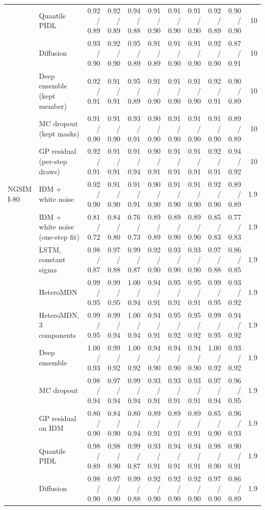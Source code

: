 \begin{table}[htbp]
\begin{tabular}{llrrrrrrrrr}
 & Quantile PIDL & 0.92 / 0.89 & 0.92 / 0.89 & 0.94 / 0.88 & 0.91 / 0.90 & 0.91 / 0.90 & 0.91 / 0.90 & 0.92 / 0.89 & 0.90 / 0.90 & 10 \\
 & Diffusion & 0.93 / 0.90 & 0.92 / 0.90 & 0.95 / 0.89 & 0.91 / 0.89 & 0.91 / 0.90 & 0.91 / 0.90 & 0.92 / 0.90 & 0.87 / 0.91 & 10 \\
 & Deep ensemble (kept member) & 0.92 / 0.91 & 0.91 / 0.91 & 0.95 / 0.89 & 0.91 / 0.90 & 0.91 / 0.90 & 0.91 / 0.90 & 0.92 / 0.91 & 0.90 / 0.89 & 10 \\
 & MC dropout (kept masks) & 0.91 / 0.90 & 0.91 / 0.90 & 0.93 / 0.91 & 0.90 / 0.90 & 0.91 / 0.90 & 0.91 / 0.90 & 0.91 / 0.90 & 0.89 / 0.89 & 10 \\
 & GP residual (per-step draws) & 0.92 / 0.91 & 0.91 / 0.91 & 0.91 / 0.94 & 0.90 / 0.91 & 0.91 / 0.91 & 0.91 / 0.91 & 0.92 / 0.91 & 0.94 / 0.92 & 10 \\
\midrule
NGSIM I-80 & IDM + white noise & 0.92 / 0.90 & 0.91 / 0.90 & 0.91 / 0.91 & 0.90 / 0.90 & 0.91 / 0.90 & 0.91 / 0.90 & 0.92 / 0.90 & 0.89 / 0.89 & 1.9 \\
 & IDM + white noise (one-step fit) & 0.81 / 0.72 & 0.84 / 0.80 & 0.76 / 0.73 & 0.89 / 0.89 & 0.89 / 0.90 & 0.89 / 0.90 & 0.85 / 0.83 & 0.77 / 0.83 & 1.9 \\
 & LSTM, constant sigma & 0.98 / 0.87 & 0.97 / 0.88 & 0.99 / 0.87 & 0.92 / 0.90 & 0.93 / 0.90 & 0.93 / 0.90 & 0.97 / 0.88 & 0.86 / 0.85 & 1.9 \\
 & HeteroMDN & 0.99 / 0.95 & 0.99 / 0.95 & 1.00 / 0.94 & 0.94 / 0.91 & 0.95 / 0.91 & 0.95 / 0.91 & 0.99 / 0.95 & 0.93 / 0.92 & 1.9 \\
 & HeteroMDN, 3 components & 0.99 / 0.95 & 0.99 / 0.94 & 1.00 / 0.94 & 0.94 / 0.91 & 0.95 / 0.92 & 0.95 / 0.92 & 0.99 / 0.95 & 0.94 / 0.92 & 1.9 \\
 & Deep ensemble & 1.00 / 0.93 & 0.99 / 0.92 & 1.00 / 0.92 & 0.94 / 0.90 & 0.94 / 0.90 & 0.94 / 0.90 & 1.00 / 0.92 & 0.93 / 0.92 & 1.9 \\
 & MC dropout & 0.98 / 0.94 & 0.97 / 0.94 & 0.99 / 0.94 & 0.93 / 0.91 & 0.93 / 0.91 & 0.93 / 0.91 & 0.97 / 0.94 & 0.96 / 0.95 & 1.9 \\
 & GP residual on IDM & 0.80 / 0.90 & 0.84 / 0.90 & 0.80 / 0.94 & 0.89 / 0.91 & 0.89 / 0.91 & 0.89 / 0.91 & 0.85 / 0.90 & 0.96 / 0.93 & 1.9 \\
 & Quantile PIDL & 0.98 / 0.89 & 0.98 / 0.90 & 0.99 / 0.87 & 0.93 / 0.91 & 0.94 / 0.91 & 0.94 / 0.91 & 0.98 / 0.90 & 0.90 / 0.91 & 1.9 \\
 & Diffusion & 0.98 / 0.90 & 0.97 / 0.90 & 0.99 / 0.88 & 0.92 / 0.90 & 0.92 / 0.90 & 0.92 / 0.90 & 0.97 / 0.90 & 0.86 / 0.89 & 1.9 \\

\end{tabular}
\end{table}
